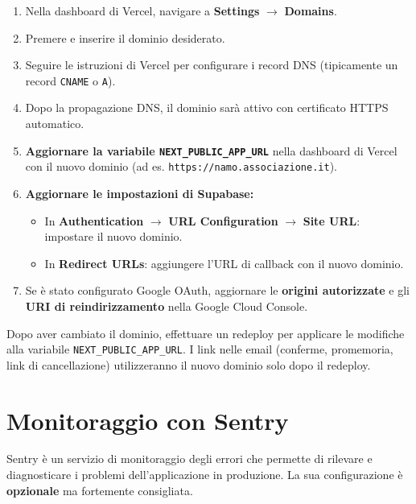 \documentclass[a4paper,11pt,oneside]{book}
\newcommand{\pulsante}[1]{\fcolorbox{namoCharcoal}{namoGray}{\small\textsf{\textbf{#1}}}}
\begin{document}
\begin{enumerate}[leftmargin=1.5em]
  \item Nella dashboard di Vercel, navigare a \textbf{Settings} $\rightarrow$ \textbf{Domains}.
  \item Premere \pulsante{Add} e inserire il dominio desiderato.
  \item Seguire le istruzioni di Vercel per configurare i record DNS (tipicamente un record \texttt{CNAME} o \texttt{A}).
  \item Dopo la propagazione DNS, il dominio sar\`a attivo con certificato HTTPS automatico.
  \item \textbf{Aggiornare la variabile \texttt{NEXT\_PUBLIC\_APP\_URL}} nella dashboard di Vercel con il nuovo dominio (ad es. \texttt{https://namo.associazione.it}).
  \item \textbf{Aggiornare le impostazioni di Supabase:}
    \begin{itemize}
      \item In \textbf{Authentication} $\rightarrow$ \textbf{URL Configuration} $\rightarrow$ \textbf{Site URL}: impostare il nuovo dominio.
      \item In \textbf{Redirect URLs}: aggiungere l'URL di callback con il nuovo dominio.
    \end{itemize}
  \item Se \`e stato configurato Google OAuth, aggiornare le \textbf{origini autorizzate} e gli \textbf{URI di reindirizzamento} nella Google Cloud Console.
\end{enumerate}

\begin{tipbox}
Dopo aver cambiato il dominio, effettuare un redeploy per applicare le modifiche alla variabile \texttt{NEXT\_PUBLIC\_APP\_URL}. I link nelle email (conferme, promemoria, link di cancellazione) utilizzeranno il nuovo dominio solo dopo il redeploy.
\end{tipbox}

\section{Monitoraggio con Sentry}
\label{sec:monitoraggio-sentry}

Sentry \`e un servizio di monitoraggio degli errori che permette di rilevare e diagnosticare i problemi dell'applicazione in produzione. La sua configurazione \`e \textbf{opzionale} ma fortemente consigliata.
\end{document}
